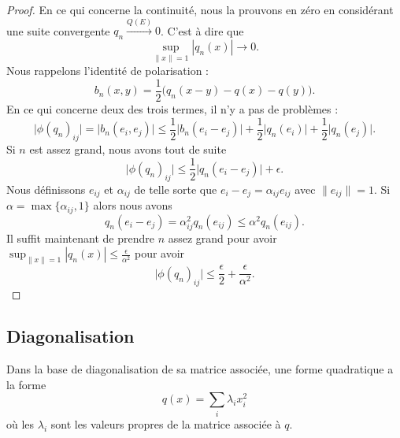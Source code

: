 \begin{proof}
    En ce qui concerne la continuité, nous la prouvons en zéro en considérant une suite convergente \( q_n\stackrel{Q(E)}{\longrightarrow}0\). C'est à dire que
    \begin{equation}
        \sup_{\| x \|=1}| q_n(x) |\to 0.
    \end{equation}
    Nous rappelons l'identité de polarisation :
    \begin{equation}
        b_n(x,y)=\frac{ 1 }{2}\big( q_n(x-y)-q(x)-q(y) \big).
    \end{equation}
    En ce qui concerne deux des trois termes, il n'y a pas de problèmes :
    \begin{equation}
        \big| \phi(q_n)_{ij} \big|=\big| b_n(e_i,e_j) \big|\leq\frac{ 1 }{2}\big| b_n(e_i-e_j) \big|+\frac{ 1 }{2}\big| q_n(e_i) \big|+\frac{ 1 }{2}\big| q_n(e_j) \big|.
    \end{equation}
    Si \( n\) est assez grand, nous avons tout de suite
    \begin{equation}
        \big| \phi(q_n)_{ij} \big|\leq \frac{ 1 }{2}\big| q_n(e_i-e_j) \big|+\epsilon.
    \end{equation}
    Nous définissons \( e_{ij}\) et \( \alpha_{ij}\) de telle sorte que \( e_i-e_j=\alpha_{ij}e_{ij}\) avec \( \| e_{ij} \|=1\). Si \( \alpha=\max\{ \alpha_{ij},1 \}\) alors nous avons
    \begin{equation}
        q_n(e_i-e_j)=\alpha_{ij}^2q_n(e_{ij})\leq \alpha^2q_n(e_{ij}).
    \end{equation}
    Il suffit maintenant de prendre \( n\) assez grand pour avoir \( \sup_{\| x \|=1}| q_n(x) |\leq \frac{ \epsilon }{ \alpha^2 }\) pour avoir
    \begin{equation}
        \big| \phi(q_n)_{ij} \big|\leq \frac{ \epsilon }{2}+\frac{ \epsilon }{ \alpha^2 }.
    \end{equation}
\end{proof}

\subsection{Diagonalisation}

\begin{proposition}\label{PropFWYooQXfcVY}
    Dans la base de diagonalisation de sa matrice associée, une forme quadratique a la forme
    \begin{equation}
        q(x)=\sum_i\lambda_ix_i^2
    \end{equation}
    où les \( \lambda_i\) sont les valeurs propres de la matrice associée à \( q\).
\end{proposition}


